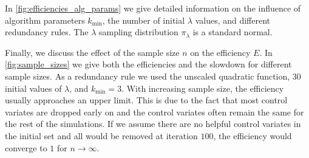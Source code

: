 In \autoref{fig:efficiencies_alg_params} we give detailed information on the influence of
algorithm parameters $k_{\min}$, the number of initial $\lambda$ values, and
different redundancy rules.
The $\lambda$ sampling distribution $\pi_{\lambda}$ is a standard normal.

Finally, we discuss the effect of the sample size $n$ on the efficiency $E$. In \autoref{fig:sample_sizes}
we give both the efficiencies and the slowdown for different sample sizes.
As a redundancy rule we used the unscaled quadratic function, $30$ initial values of $\lambda$,
and $k_{\min}=3$. With increasing sample size, the efficiency usually approaches an upper limit.
This is due to the fact that most control  variates are dropped early on and
the control  variates often remain the same for the rest of the simulations.
If we assume there are no helpful control  variates in the initial set
and all would be removed at iteration $100$, the efficiency would converge to $1$
for $n\to \infty$.
